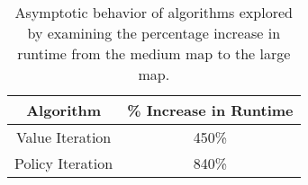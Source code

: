 \begin{table}[]
\centering
\caption{Asymptotic behavior of algorithms explored by examining the percentage increase in runtime from the medium map to the large map.}
\label{table:valueitervspolicyiter}
\begin{tabular}{@{}cc@{}}
\toprule
\textbf{Algorithm} & \textbf{\% Increase in Runtime} \\ \midrule
Value Iteration    & 450\%                           \\
Policy Iteration   & 840\%                           \\ \bottomrule
\end{tabular}
\end{table}